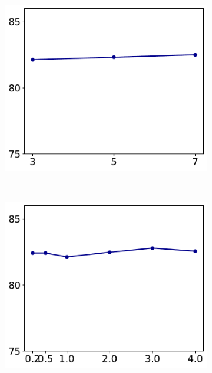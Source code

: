 \documentclass[10pt]{article} %
\begin{document}
\begin{figure}[ht]
\begin{center}
\begin{subfigure}[b]{0.22 \linewidth}
\begin{center}
        \caption{}
        \label{fig:nchannel} 
        \end{center}
    \end{subfigure}
    \,
    \begin{subfigure}[b]{0.22 \linewidth}
        \begin{center}
        \includegraphics[width=\linewidth]{./img/nkernel}
        \caption{}
        \label{fig:nkernel} 
        \end{center}
    \end{subfigure}
    \,
    \begin{subfigure}[b]{0.22\linewidth}
        \begin{center}
        \includegraphics[width=\linewidth]{./img/nlambda}

\end{center}
\end{subfigure}
\end{center}
\end{figure}
\end{document}
